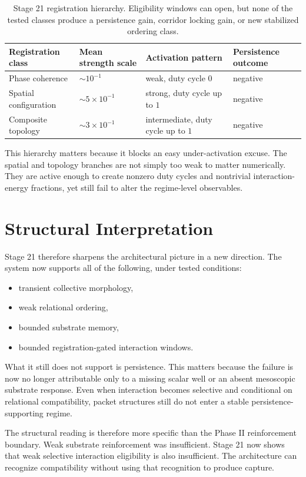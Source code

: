 \documentclass[11pt]{article}
\begin{document}
\begin{table}[h]
\centering
\begin{tabular}{@{}llll@{}}
\toprule
Registration class & Mean strength scale & Activation pattern & Persistence outcome \\
\midrule
Phase coherence & $\sim 10^{-1}$ & weak, duty cycle $0$ & negative \\
Spatial configuration & $\sim 5\times10^{-1}$ & strong, duty cycle up to $1$ & negative \\
Composite topology & $\sim 3\times10^{-1}$ & intermediate, duty cycle up to $1$ & negative \\
\bottomrule
\end{tabular}
\caption{Stage 21 registration hierarchy. Eligibility windows can open, but none of the tested classes produce a persistence gain, corridor locking gain, or new stabilized ordering class.}
\end{table}

This hierarchy matters because it blocks an easy under-activation excuse. The spatial and topology branches are not simply too weak to matter numerically. They are active enough to create nonzero duty cycles and nontrivial interaction-energy fractions, yet still fail to alter the regime-level observables.

\section{Structural Interpretation}

Stage 21 therefore sharpens the architectural picture in a new direction. The system now supports all of the following, under tested conditions:
\begin{itemize}
\item transient collective morphology,
\item weak relational ordering,
\item bounded substrate memory,
\item bounded registration-gated interaction windows.
\end{itemize}
What it still does not support is persistence. This matters because the failure is now no longer attributable only to a missing scalar well or an absent mesoscopic substrate response. Even when interaction becomes selective and conditional on relational compatibility, packet structures still do not enter a stable persistence-supporting regime.

The structural reading is therefore more specific than the Phase II reinforcement boundary. Weak substrate reinforcement was insufficient. Stage 21 now shows that weak selective interaction eligibility is also insufficient. The architecture can recognize compatibility without using that recognition to produce capture.
\end{document}

